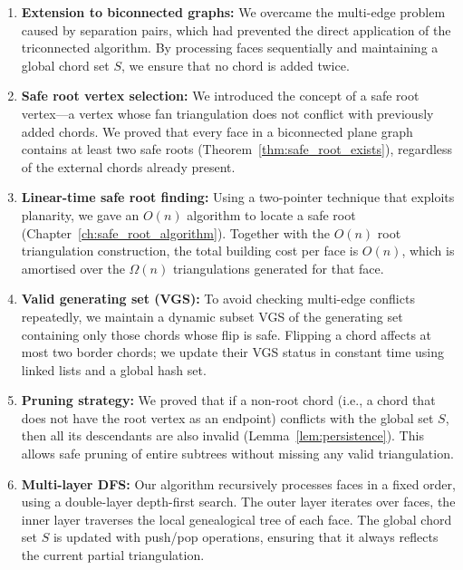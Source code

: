\begin{enumerate}
    \item \textbf{Extension to biconnected graphs:} 
    We overcame the multi-edge problem caused by separation pairs, which had prevented the direct application of the triconnected algorithm. 
    By processing faces sequentially and maintaining a global chord set \(S\), we ensure that no chord is added twice.
    
    \item \textbf{Safe root vertex selection:} 
    We introduced the concept of a safe root vertex—a vertex whose fan triangulation does not conflict with previously added chords. 
    We proved that every face in a biconnected plane graph contains at least two safe roots (Theorem~\ref{thm:safe_root_exists}), regardless of the external chords already present.
    
    \item \textbf{Linear-time safe root finding:} 
    Using a two-pointer technique that exploits planarity, we gave an \(O(n)\) algorithm to locate a safe root (Chapter~\ref{ch:safe_root_algorithm}). 
    Together with the \(O(n)\) root triangulation construction, the total building cost per face is \(O(n)\), which is amortised over the \(\Omega(n)\) triangulations generated for that face.
    
    \item \textbf{Valid generating set (VGS):} 
    To avoid checking multi-edge conflicts repeatedly, we maintain a dynamic subset VGS of the generating set containing only those chords whose flip is safe. 
    Flipping a chord affects at most two border chords; we update their VGS status in constant time using linked lists and a global hash set.
    
    \item \textbf{Pruning strategy:} 
    We proved that if a non-root chord (i.e., a chord that does not have the root vertex as an endpoint) conflicts with the global set \(S\), then all its descendants are also invalid (Lemma~\ref{lem:persistence}). 
    This allows safe pruning of entire subtrees without missing any valid triangulation.
    
    \item \textbf{Multi-layer DFS:} 
    Our algorithm recursively processes faces in a fixed order, using a double-layer depth-first search. 
    The outer layer iterates over faces, the inner layer traverses the local genealogical tree of each face. 
    The global chord set \(S\) is updated with push/pop operations, ensuring that it always reflects the current partial triangulation.
    

\end{enumerate}
